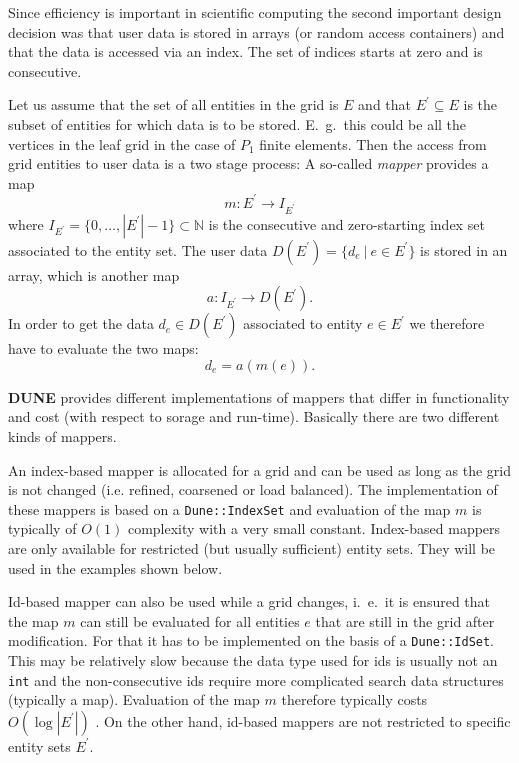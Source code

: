 \documentclass[11pt,a4paper,headinclude,footinclude,DIV16,normalheadings]{scrreprt}
\newcommand{\Dune}{{\sf\bfseries DUNE}}
\begin{document}
Since efficiency is important in scientific computing the second
important design decision was that user data is stored in arrays (or
random access containers) and that the data is accessed via an
index. The set of indices starts at zero and is consecutive. 

Let us assume that the set of all entities in the grid is $E$ and
that $E^\prime\subseteq E$ is the subset of entities for which data is
to be stored. E.~g.~this could be all the vertices in the leaf grid in
the case of $P_1$ finite elements. Then the access from grid entities
to user data is a two stage process: A so-called \textit{mapper}
provides a map
\begin{equation}
m : E^\prime \to I_{E^\prime}
\end{equation}
where $I_{E^\prime}=\{0,\ldots,|E^\prime|-1\}\subset\mathbb{N}$ is the consecutive and
zero-starting index set associated to the entity set. The user data
$D(E^\prime)=\{d_e\ |\ e\in E^\prime\}$ is stored in an array, which
is another map
\begin{equation}
a : I_{E^\prime} \to D(E^\prime).
\end{equation}
In order to get the data $d_e\in D(E^\prime)$ associated to entity
$e\in E^\prime$ we therefore have to evaluate the two maps:
\begin{equation}
d_e = a(m(e)) .
\end{equation}

\Dune{} provides different implementations of mappers that differ in
functionality and cost (with respect to sorage and
run-time). Basically there are two different kinds of mappers. 


An index-based mapper is allocated for a grid and can be used as long
as the grid is not changed (i.e. refined, coarsened or load
balanced). The implementation of these mappers is based on a
\lstinline!Dune::IndexSet! and evaluation of the map $m$ is typically
of $O(1)$ complexity with a very small constant. 
Index-based mappers are only available for restricted (but
usually sufficient) entity sets. They will be used in the examples
shown below. 


Id-based mapper can also be used while a grid changes, i.~e.~it is
ensured that the map $m$ can still be evaluated for all entities $e$
that are still in the grid after modification. For that it
has to be implemented on the basis of a \lstinline!Dune::IdSet!. This may be
relatively slow because the data type used for ids is usually not an
\lstinline!int! and the non-consecutive ids require more complicated search data
structures (typically a map). Evaluation of the map $m$ therefore
typically costs $O(\log |E^\prime|)$ . On the other hand, id-based
mappers are not restricted to specific entity sets $E^\prime$. 
\end{document}
